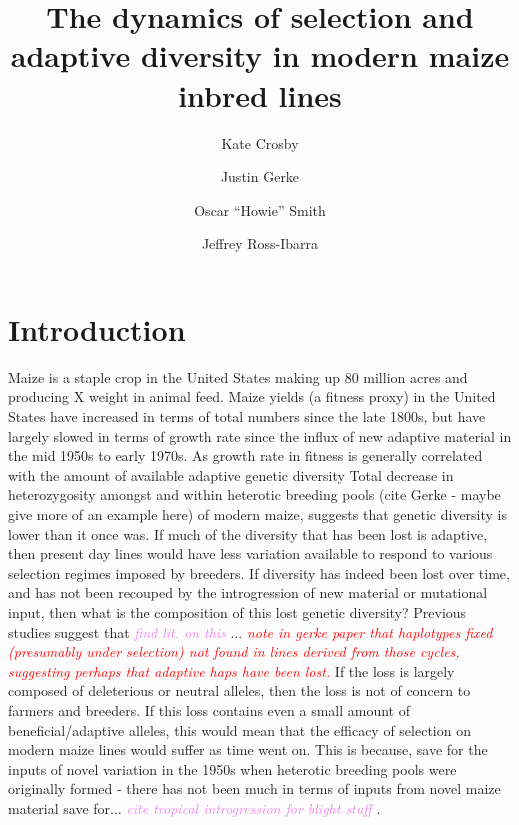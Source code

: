 \documentclass[9pt,twocolumn,twoside]{gsajnl}
\title{The dynamics of selection and adaptive diversity in modern maize inbred lines}
\author[$\ast$,1]{Kate Crosby}
\author[$\S$]{Justin Gerke}
\author[$\dagger$]{Oscar ``Howie'' Smith}
\author[$\ddagger$,1]{Jeffrey Ross-Ibarra}
\affil[$\ast$]{Author one affiliation}
\affil[$\S$]{Author two affiliation}
\affil[$\dagger$]{Author three affiliation}
\affil[$\ddagger$]{Author four affiliation}
\newcommand{\jri}[1]{\textcolor{red}{ \emph{ #1}} }
\newcommand{\kc}[1]{\textcolor{violet}{ \emph{ #1}} }
\begin{document}
\maketitle
\thispagestyle{firststyle}
\marginmark
\firstpagefootnote
{}
\vspace{-11pt}%




\section*{Introduction}

\lettrine[lines=2]{\color{color2}M}{}aize is a staple crop in the United States making up 80 million acres and producing X weight in animal feed. 
Maize yields (a fitness proxy) in the United States have increased in terms of total numbers since the late 1800s, but have largely slowed in terms of growth rate since the influx of new adaptive material in the mid 1950s to early 1970s. As growth rate in fitness is generally correlated with the amount of available adaptive genetic diversity 
Total decrease in heterozygosity amongst and within heterotic breeding pools (cite Gerke - maybe give more of an example here) of modern maize, suggests that genetic diversity is lower than it once was. 
If much of the diversity that has been lost is adaptive, then present day lines would have less variation available to respond to various selection regimes imposed by breeders. 
If diversity has indeed been lost over time, and has not been recouped by the introgression of new material or mutational input, then what is the composition of this lost genetic diversity? Previous studies suggest that \kc{find lit. on this}...
\jri{note in gerke paper that haplotypes fixed (presumably under selection) not found in lines derived from those cycles, suggesting perhaps that adaptive haps have been lost.}
If the loss is largely composed of deleterious or neutral alleles, then the loss is not of concern to farmers and breeders. 
If this loss contains even a small amount of beneficial/adaptive alleles, this would mean that the efficacy of selection on modern maize lines would suffer as time went on. 
This is because, save for the inputs of novel variation in the 1950s when heterotic breeding pools were originally formed - there has not been much in terms of inputs from novel maize material save for... \kc{cite tropical introgression for blight stuff}.
\end{document}
